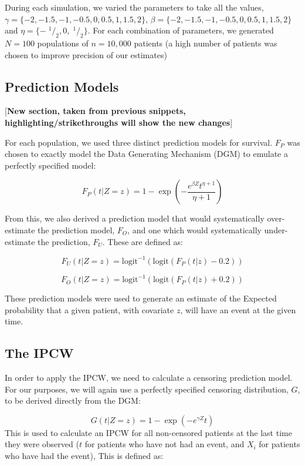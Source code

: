 \documentclass[12pt,PhD,twoside,openright]{muthesis}
\newcommand{\txt}[1]{\textrm{#1}}
\def\logit{\txt{logit}}
\newcommand{\sfrac}[2]{\;^{#1}/_{#2}}
\begin{document}
During each simulation, we varied the parameters to take all the values,\(\gamma = \{-2,-1.5,-1,-0.5,0,0.5,1,1.5,2\}\), \(\beta = \{-2,-1.5,-1,-0.5,0,0.5,1,1.5,2\}\) and \(\eta = \{-\sfrac{1}{2},0,\sfrac{1}{2}\}\). For each combination of parameters, we generated \(N = 100\) populations of \(n = 10,000\) patients (a high number of patients was chosen to improve precision of our estimates)

\hypertarget{prediction-models}{%
\subsection{Prediction Models}\label{prediction-models}}

{[}\textbf{New section, taken from previous snippets, highlighting/strikethroughs will show the new changes}{]}

For each population, we used three distinct prediction models for survival. \(F_P\) was chosen to exactly model the Data Generating Mechanism (DGM) to emulate a perfectly specified model:

\[
F_P(t|Z = z) = 1 - \exp\left(-\frac{e^{\beta Z}t^{\eta+1}}{\eta+1}\right)
\]

From this, we also derived a prediction model that would systematically over-estimate the prediction model, \(F_O\), and one which would systematically under-estimate the prediction, \(F_U\). These are defined as:

\[
F_U(t|Z=z) = \logit^{-1}\left(\logit\left( F_P(t|z) - 0.2\right)\right)
\]

\[
F_O(t|Z=z) = \logit^{-1}\left(\logit\left( F_P(t|z) + 0.2\right)\right)
\]

These prediction models were used to generate an estimate of the Expected probability that a given patient, with covariate \(z\), will have an event at the given time.

\hypertarget{the-ipcw}{%
\subsection{The IPCW}\label{the-ipcw}}

In order to apply the IPCW, we need to calculate a censoring prediction model. For our purposes, we will again use a perfectly specified censoring distribution, \(G\), to be derived directly from the DGM:

\[
G(t|Z=z) = 1-\exp\left(-e^{\gamma Z}t\right)
\]
This is used to calculate an IPCW for all non-censored patients at the last time they were observed (\(t\) for patients who have not had an event, and \(X_i\) for patients who have had the event), This is defined as:
\end{document}
